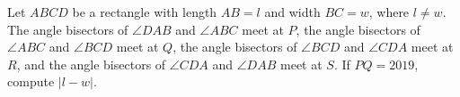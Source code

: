 Let $ABCD$ be a rectangle with length $AB=l$ and width $BC=w$, where $l\ne w$. The angle bisectors of $\angle DAB$ and $\angle ABC$ meet at $P$, the angle bisectors of $\angle ABC$ and $\angle BCD$ meet at $Q$, the angle bisectors of $\angle BCD$ and $\angle CDA$ meet at $R$, and the angle bisectors of $\angle CDA$ and $\angle DAB$ meet at $S$. If $PQ=2019$, compute $|l-w|$.
